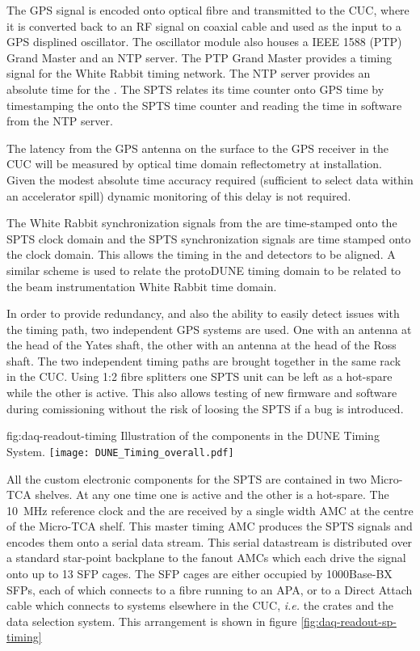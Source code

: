 The GPS signal is encoded onto optical fibre and transmitted to the
CUC, where it is converted back to an RF signal on coaxial cable and
used as the input to a GPS displined oscillator. The oscillator module
also houses a IEEE 1588 (PTP) Grand Master and an NTP server. The PTP
Grand Master provides a timing signal for the  White Rabbit
timing network. The NTP server provides an absolute time for the
. The SPTS relates its time counter onto GPS time by
timestamping the  onto the SPTS time counter and reading
the time in software from the NTP server.

The latency from the GPS antenna on the surface to the GPS receiver in
the CUC will be measured by optical time domain reflectometry at
installation. Given the modest absolute time accuracy required
(sufficient to select data within an accelerator spill) dynamic
monitoring of this delay is not required.

The White Rabbit synchronization signals from the   are
time-stamped onto the SPTS clock domain and the SPTS synchronization
signals are time stamped onto the  clock domain. This allows
the timing in the  and  detectors to be
aligned. A similar scheme is used to relate the  protoDUNE
 timing domain to be related to the beam instrumentation
White Rabbit time domain.

In order to provide redundancy, and also the ability to easily detect
issues with the timing path, two independent GPS systems are used. One
with an antenna at the head of the Yates shaft, the other with an
antenna at the head of the Ross shaft. The two independent timing
paths are brought together in the same rack in the CUC. Using 1:2
fibre splitters one SPTS unit can be left as a hot-spare while the
other is active. This also allows testing of new firmware and software
during comissioning without the risk of loosing the SPTS if a bug is
introduced.


\begin{dunefigure}{fig:daq-readout-timing}
  {Illustration of the components in the DUNE Timing System.}
\texttt{[image: DUNE\_Timing\_overall.pdf]}
\end{dunefigure}

All the custom electronic components for the SPTS are contained in two
Micro-TCA shelves. At any one time one is active and the other is a
hot-spare. The \SI{10}{\MHz} reference clock and the  are received
by a single width AMC at the centre of the Micro-TCA shelf. This
master timing AMC produces the SPTS signals and encodes them onto a
serial data stream. This serial datastream is distributed over a
standard star-point backplane to the fanout AMCs which each drive the
signal onto up to 13 SFP cages. The SFP cages are either occupied by
1000Base-BX SFPs, each of which connects to a fibre running to an APA,
or to a Direct Attach cable which connects to systems elsewhere in the
CUC, {\it i.e.} the  crates and the data selection system. This
arrangement is shown in figure \ref{fig:daq-readout-sp-timing}


